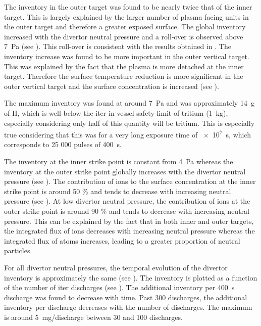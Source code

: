 The \gls{inventory} in the outer target was found to be nearly twice that of the inner target.
This is largely explained by the larger number of plasma facing units in the outer target and therefore a greater exposed surface.
The global \gls{inventory} increased with the \gls{divertor} neutral pressure and a roll-over is observed above \SI{7}{Pa} (see ).
This roll-over is consistent with the results obtained in .
The \gls{inventory} increase was found to be more important in the outer vertical target.
This was explained by the fact that the plasma is more detached at the inner target.
Therefore the surface temperature reduction is more significant in the outer vertical target and the surface concentration is increased (see ).

The maximum \gls{inventory} was found at around \SI{7}{Pa} and was approximately \SI{14}{g} of H, which is well below the \gls{iter} in-vessel safety limit of tritium (\SI{1}{kg}), especially considering only half of this quantity will be tritium.
This is especially true considering that this was for a very long exposure time of \SI{e7}{s}, which corresponds to 25 000 pulses of \SI{400}{s}.


The inventory at the inner \gls{strike point} is constant from \SI{4}{Pa} whereas the inventory at the outer \gls{strike point} globally increases with the \gls{divertor} neutral pressure (see ).
The contribution of ions to the surface concentration at the inner strike point is around 50 \% and tends to decrease with increasing neutral pressure (see ).
At low \gls{divertor} neutral pressure, the contribution of ions at the outer strike point is around 90 \% and tends to decrease with increasing neutral pressure.
This can be explained by the fact that in both inner and outer targets, the integrated flux of ions decreases with increasing neutral pressure whereas the integrated flux of atoms increases, leading to a greater proportion of neutral particles.

For all \gls{divertor} neutral pressures, the temporal evolution of the \gls{divertor} \gls{inventory} is approximately the same (see ).
The \gls{inventory} is plotted as a function of the number of \gls{iter} discharges (see ).
The additional \gls{inventory} per \SI{400}{s} discharge was found to decrease with time.
Past 300 discharges, the additional \gls{inventory} per discharge decreases with the number of discharges.
The maximum is around \SI{5}{mg/discharge} between 30 and 100 discharges.

